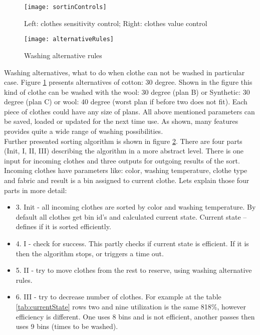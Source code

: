 \begin{figure}[h]
	\centering
		\texttt{[image: sortinControls]}
	\caption{Left: clothes sensitivity control; Right: clothes value control}
	\label{fig:sortinControls}
\end{figure}

\begin{figure}[h]
	\centering
		\texttt{[image: alternativeRules]}
	\caption{Washing alternative rules}
	\label{fig:alternativeRules}
\end{figure}

Washing alternatives, what to do when clothe can not be washed in particular case. Figure \ref{fig:sortinControls} presents alternatives of cotton: 30 degree. Shown in the figure this kind of clothe can be washed with the wool: 30 degree (plan B) or Synthetic: 30 degree (plan C) or wool: 40 degree (worst plan if before two does not fit). Each piece of clothes could have any size of plans. All above mentioned parameters can be saved, loaded or updated for the next time use. As shown, many features provides quite a wide range of washing possibilities.
\\
Further presented sorting algorithm is shown in figure \ref{fig:alternativeRules}. There are four parts (Init, I, II, III) describing the algorithm in a more abstract level. There is one input for incoming clothes and three outputs for outgoing results of the sort. Incoming clothes have parameters like: color, washing temperature, clothe type and fabric and result is a bin assigned to current clothe.  Lets explain those four parts in more detail:

\begin{itemize}
	\item 3. Init - all incoming clothes are sorted by color and washing temperature. By default all clothes get bin id's and calculated current state. Current state – defines if it is sorted efficiently.
	\item 4. I - check for success. This partly checks if current state is efficient. If it is then the algorithm stops, or triggers a time out.
	\item 5. II - try to move clothes from the rest to reserve, using washing alternative rules. 
	\item 6. III - try to decrease number of clothes. For example at the table \ref{tab:currentState} rows two and nine utilization is the same 818\%, however efficiency is different. One uses 8 bins and is not efficient, another passes then uses 9 bins (times to be washed).
\end{itemize}

